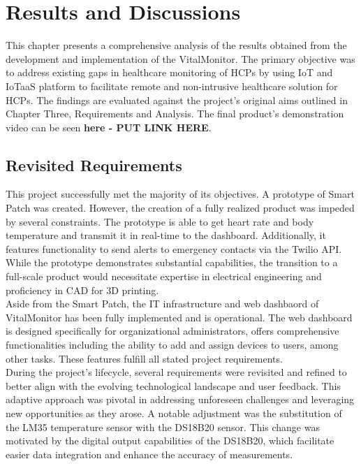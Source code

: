 \chapter{Results and Discussions}

This chapter presents a comprehensive analysis of the results obtained from the development and implementation of the VitalMonitor. The primary objective was to address existing gaps in healthcare monitoring of HCPs by using IoT and IoTaaS platform to facilitate remote and non-intrusive healthcare solution for HCPs. The findings are evaluated against the project's original aims outlined in Chapter Three, Requirements and Analysis. The final product's demonstration video can be seen \textbf{here - PUT LINK HERE}.

\section{Revisited Requirements}
This project successfully met the majority of its objectives. A prototype of Smart Patch was created. However, the creation of a fully realized product was impeded by several constraints. The prototype is able to get heart rate and body temperature and transmit it in real-time to the dashboard. Additionally, it features functionality to send alerts to emergency contacts via the Twilio API. While the prototype demonstrates substantial capabilities, the transition to a full-scale product would necessitate expertise in electrical engineering and proficiency in CAD for 3D printing. \\

\noindent Aside from the Smart Patch, the IT infrastructure and web dashbaord of VitalMonitor has been fully implemented and is operational. The web dashboard is designed specifically for organizational administrators, offers comprehensive functionalities including the ability to add and assign devices to users, among other tasks. These features fulfill all stated project requirements. \\

\noindent During the project's lifecycle, several requirements were revisited and refined to better align with the evolving technological landscape and user feedback. This adaptive approach was pivotal in addressing unforeseen challenges and leveraging new opportunities as they arose. A notable adjustment was the substitution of the LM35 temperature sensor with the DS18B20 sensor. This change was motivated by the digital output capabilities of the DS18B20, which facilitate easier data integration and enhance the accuracy of measurements.

